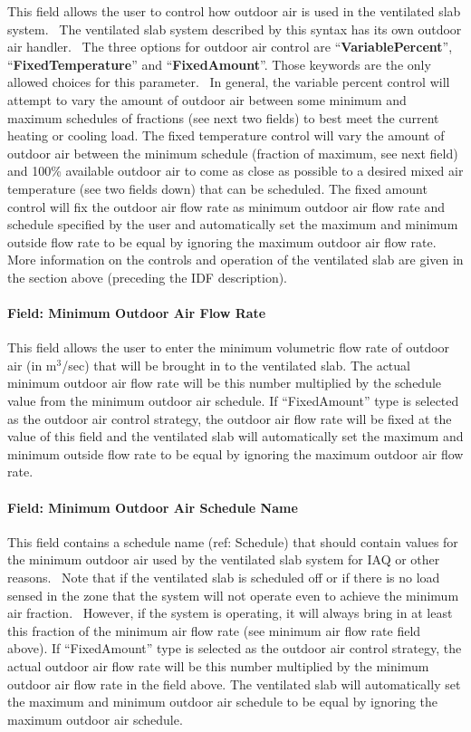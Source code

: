 This field allows the user to control how outdoor air is used in the ventilated slab system.~ The ventilated slab system described by this syntax has its own outdoor air handler.~ The three options for outdoor air control are ``\textbf{VariablePercent}'', ``\textbf{FixedTemperature}'' and ``\textbf{FixedAmount}''. Those keywords are the only allowed choices for this parameter.~ In general, the variable percent control will attempt to vary the amount of outdoor air between some minimum and maximum schedules of fractions (see next two fields) to best meet the current heating or cooling load. The fixed temperature control will vary the amount of outdoor air between the minimum schedule (fraction of maximum, see next field) and 100\% available outdoor air to come as close as possible to a desired mixed air temperature (see two fields down) that can be scheduled. The fixed amount control will fix the outdoor air flow rate as minimum outdoor air flow rate and schedule specified by the user and automatically set the maximum and minimum outside flow rate to be equal by ignoring the maximum outdoor air flow rate. More information on the controls and operation of the ventilated slab are given in the section above (preceding the IDF description).

\paragraph{Field: Minimum Outdoor Air Flow Rate}\label{field-minimum-outdoor-air-flow-rate-001}

This field allows the user to enter the minimum volumetric flow rate of outdoor air (in m\(^{3}\)/sec) that will be brought in to the ventilated slab. The actual minimum outdoor air flow rate will be this number multiplied by the schedule value from the minimum outdoor air schedule. If ``FixedAmount'' type is selected as the outdoor air control strategy, the outdoor air flow rate will be fixed at the value of this field and the ventilated slab will automatically set the maximum and minimum outside flow rate to be equal by ignoring the maximum outdoor air flow rate.

\paragraph{Field: Minimum Outdoor Air Schedule Name}\label{field-minimum-outdoor-air-schedule-name-001}

This field contains a schedule name (ref: Schedule) that should contain values for the minimum outdoor air used by the ventilated slab system for IAQ or other reasons.~ Note that if the ventilated slab is scheduled off or if there is no load sensed in the zone that the system will not operate even to achieve the minimum air fraction.~ However, if the system is operating, it will always bring in at least this fraction of the minimum air flow rate (see minimum air flow rate field above). If ``FixedAmount'' type is selected as the outdoor air control strategy, the actual outdoor air flow rate will be this number multiplied by the minimum outdoor air flow rate in the field above. The ventilated slab will automatically set the maximum and minimum outdoor air schedule to be equal by ignoring the maximum outdoor air schedule.

